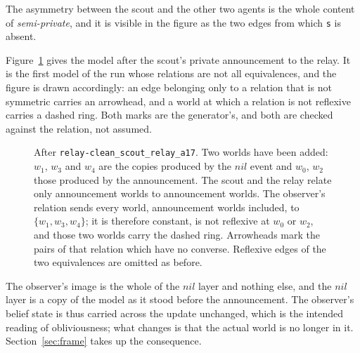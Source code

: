 \documentclass[11pt,a4paper]{article}
\theoremstyle{definition}
\newcommand{\code}[1]{\texttt{\small #1}}
\begin{document}
The asymmetry between the scout and the other two agents is the whole content
of \emph{semi-private}, and it is visible in the figure as the two edges from
which \code{s} is absent.

\begin{table}[H]
\centering\small
\caption{The equivalence classes of each agent's relation after
\code{scan\_scout\_a17}. All three relations are still equivalences at this
model, so all three have classes. Designated worlds are set in bold, and a
class of size one is a question that agent has settled.}
\label{tab:part3}

\end{table}

Figure~\ref{fig:kripke4} gives the model after the scout's private
announcement to the relay. It is the first model of the run whose relations are
not all equivalences, and the figure is drawn accordingly: an edge belonging
only to a relation that is not symmetric carries an arrowhead, and a world at
which a relation is not reflexive carries a dashed ring. Both marks are the
generator's, and both are checked against the relation, not assumed.

\begin{figure}[H]
\centering

\caption{After \code{relay-clean\_scout\_relay\_a17}. Two worlds have been
added: $w_1$, $w_3$ and $w_4$ are the copies produced by the $\mathit{nil}$
event and $w_0$, $w_2$ those produced by the announcement. The scout and the
relay relate only announcement worlds to announcement worlds. The observer's
relation sends every world, announcement worlds included, to
$\{w_1, w_3, w_4\}$; it is therefore constant, is not reflexive at $w_0$ or
$w_2$, and those two worlds carry the dashed ring. Arrowheads mark the pairs of
that relation which have no converse. Reflexive edges of the two equivalences
are omitted as before.}
\label{fig:kripke4}
\end{figure}

The observer's image is the whole of the $\mathit{nil}$ layer and nothing else,
and the $\mathit{nil}$ layer is a copy of the model as it stood before the
announcement. The observer's belief state is thus carried across the update
unchanged, which is the intended reading of obliviousness; what changes is that
the actual world is no longer in it. Section~\ref{sec:frame} takes up the
consequence.

\begin{table}[H]
\centering\small
\caption{Each agent's relation after the announcement. For the scout and the
relay the relation is an equivalence and is given by its classes; for the
observer it is not, and is given by the map $w \mapsto R(w)$, marked $\dagger$.
Designated worlds are set in bold. The relay's classes have separated although
the relay measured nothing: what it learnt is the restriction of its relation
to the worlds at which the speaker's precondition holds.}
\label{tab:part4}

\end{table}
\end{document}
